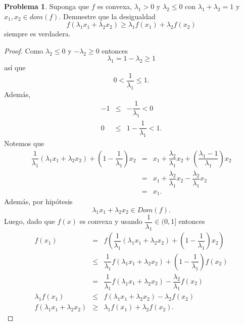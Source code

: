 \documentclass[12pt,letterpaper]{article}
\theoremstyle{definition}
\newtheorem{problm}{Problema}
\begin{document}
\begin{problm}
	Suponga que $ f $ es convexa, $ \lambda_1 > 0 $ y $ \lambda_2 \leq 0 $ con $ \lambda_1 + \lambda_2 = 1 $ y $ x_1, x_2 \in dom(f) $. Demuestre que la desigualdad
	\[ f(\lambda_1 x_1 + \lambda_2 x_2) \geq \lambda_1 f(x_1) + \lambda_2 f(x_2) \]
	siempre es verdadera.
	\begin{proof}
		Como $ \lambda_2 \leq 0 $ y $ - \lambda_2 \geq 0 $ entonces
		\[ \lambda_1 = 1 - \lambda_2 \geq 1 \]
		así que
		\begin{equation}
			0 < \dfrac{1}{\lambda_1} \leq 1.
		\end{equation}
		Además, 
		\begin{eqnarray*}
			-1 & \leq & -\dfrac{1}{\lambda_1} < 0 \\
			 0 & \leq & 1 - \dfrac{1}{\lambda_1} < 1.
		\end{eqnarray*}
		Notemos que
		\begin{eqnarray*}
			\dfrac{1}{\lambda_1} (\lambda_1 x_1 + \lambda_2 x_2) + \left( 1-\dfrac{1}{\lambda_1} \right)x_2 & = & x_1 + \dfrac{\lambda_2}{\lambda_1} x_2 + \left( \dfrac{\lambda_1 - 1}{\lambda_1} \right) x_2 \\
											  & = & x_1 + \dfrac{\lambda_2}{\lambda_1} x_2 - \dfrac{\lambda_2}{\lambda_1} x_2 \\
											  & = & x_1.
		\end{eqnarray*}
		Además, por hipótesis
		\[ \lambda_1 x_1 + \lambda_2 x_2 \in Dom(f). \]
		Luego, dado que $ f(x) $ es convexa y usando $ \dfrac{1}{\lambda_1} \in (0,1] $ entonces
		\begin{eqnarray*}
			f (x_1) & = & f \left( \dfrac{1}{\lambda_1} (\lambda_1 x_1 + \lambda_2 x_2) + \left( 1-\dfrac{1}{\lambda_1} \right)x_2 \right) \\
			        & \leq & \dfrac{1}{\lambda_1} f(\lambda_1 x_1 + \lambda_2 x_2) + \left( 1-\dfrac{1}{\lambda_1} \right)f(x_2) \\
			        & = & \dfrac{1}{\lambda_1} f(\lambda_1 x_1 + \lambda_2 x_2) - \dfrac{\lambda_2}{\lambda_1} f(x_2) \\
		    \lambda_1 f (x_1) & \leq & f(\lambda_1 x_1 + \lambda_2 x_2) - \lambda_2 f(x_2) \\
		    f(\lambda_1 x_1 + \lambda_2 x_2) & \geq & \lambda_1 f (x_1) + \lambda_2 f(x_2).
		\end{eqnarray*}
	\end{proof}
\end{problm}
\end{document}
